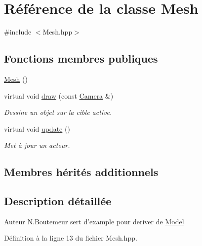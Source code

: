 \hypertarget{classMesh}{\section{Référence de la classe Mesh}
\label{classMesh}
}


{\ttfamily \#include $<$Mesh.\+hpp$>$}

\subsection*{Fonctions membres publiques}
\begin{DoxyCompactItemize}
\item 
\hyperlink{classMesh_a2af137f1571af89172b9c102302c416b}{Mesh} ()
\item 
virtual void \hyperlink{classMesh_aeb4e185f5d443690132b8e88bf5c669c}{draw} (const \hyperlink{classCamera}{Camera} \&)
\begin{DoxyCompactList}\small\item\em Dessine un objet sur la cible active. \end{DoxyCompactList}\item 
virtual void \hyperlink{classMesh_abb6110295efe8ae479659e46553c952a}{update} ()
\begin{DoxyCompactList}\small\item\em Met à jour un acteur. \end{DoxyCompactList}\end{DoxyCompactItemize}
\subsection*{Membres hérités additionnels}


\subsection{Description détaillée}
\begin{DoxyAuthor}{Auteur}
N.\+Boutemeur sert d'example pour deriver de \hyperlink{classModel}{Model} 
\end{DoxyAuthor}


Définition à la ligne 13 du fichier Mesh.\+hpp.



